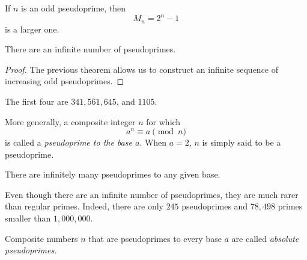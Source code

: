 \documentclass{article}
\newcounter{theorem}[section]
\newcounter{definition}[section]
\begin{document}
\begin{theorem}
  \label{thm:generating-a-larger-pseudoprime}
If $n$ is an odd pseudoprime, then 
\begin{equation}
  M_n = 2^n -1
\end{equation}
is a larger one. 
\end{theorem}

\begin{corollary}
  \label{thm:infinitude-of-pseudoprimes}
There are an infinite number of pseudoprimes. 
\end{corollary}
\begin{proof}
The previous theorem allows us to construct an infinite sequence of increasing odd pseudoprimes. 
\end{proof}
The first four are $341, 561, 645$, and $1105$. 

\begin{definition}
  \label{def:pseudoprime-to-the-base-a}
More generally, a composite integer $n$ for which 
\begin{equation}
  a^n \equiv a \pmod{n}
\end{equation}
is called a \textit{pseudoprime to the base $a$}. When $a=2$, $n$ is simply said to be a pseudoprime. 
\end{definition}

\begin{theorem}
  \label{thm:infinitude-of-pseudoprimes-to-a-given-base}
There are infinitely many pseudoprimes to any given base. 
\end{theorem}
Even though there are an infinite number of pseudoprimes, they are much rarer than regular primes. Indeed, there are only $245$ pseudoprimes and $78,498$ primes smaller than $1,000,000$.

\begin{definition}
  \label{def:absolute-pseudoprime}
Composite numbers $n$ that are pseudoprimes to every base $a$ are called \textit{absolute pseudoprimes}. 
\end{definition}
\end{document}
